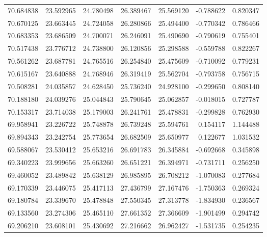 \begin{tabular}{rrrrrrr}
 70.684838 &  23.592965 &         24.780498 &         26.389467 &         25.569120 & -0.788622 &  0.820347 \\
 70.670125 &  23.663445 &         24.724058 &         26.280866 &         25.494400 & -0.770342 &  0.786466 \\
 70.683353 &  23.686509 &         24.700071 &         26.246091 &         25.490690 & -0.790619 &  0.755401 \\
 70.517438 &  23.776712 &         24.738800 &         26.120856 &         25.298588 & -0.559788 &  0.822267 \\
 70.561262 &  23.687781 &         24.765516 &         26.254840 &         25.475609 & -0.710092 &  0.779231 \\
 70.615167 &  23.640888 &         24.768946 &         26.319419 &         25.562704 & -0.793758 &  0.756715 \\
 70.508281 &  24.035857 &         24.628450 &         25.736240 &         24.928100 & -0.299650 &  0.808140 \\
 70.188180 &  24.039276 &         25.044843 &         25.790645 &         25.062857 & -0.018015 &  0.727787 \\
 70.153317 &  23.714038 &         25.179003 &         26.241761 &         25.478831 & -0.299828 &  0.762930 \\
 69.958941 &  23.226722 &         25.748878 &         26.739248 &         25.594761 &  0.154117 &  1.144488 \\
 69.894343 &  23.242754 &         25.773654 &         26.682509 &         25.650977 &  0.122677 &  1.031532 \\
 69.588067 &  23.530412 &         25.653216 &         26.691783 &         26.345884 & -0.692668 &  0.345898 \\
 69.340223 &  23.999656 &         25.663260 &         26.651221 &         26.394971 & -0.731711 &  0.256250 \\
 69.460052 &  23.489842 &         25.638129 &         26.985895 &         26.708212 & -1.070083 &  0.277684 \\
 69.170339 &  23.446075 &         25.417113 &         27.436799 &         27.167476 & -1.750363 &  0.269324 \\
 69.180784 &  23.339670 &         25.478848 &         27.550345 &         27.313778 & -1.834930 &  0.236567 \\
 69.133560 &  23.274306 &         25.465110 &         27.661352 &         27.366609 & -1.901499 &  0.294742 \\
 69.206210 &  23.608101 &         25.430692 &         27.216662 &         26.962427 & -1.531735 &  0.254235 \\

\end{tabular}

